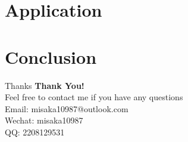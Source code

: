 \documentclass[aspectratio=169]{beamer}
\begin{document}
	\section{Application}
	
	\begin{frame}{}
		\begin{center}
		\end{center}
	\end{frame}

	\section{Conclusion}

	\begin{frame}{Thanks}
		\centering
		{\Huge \textbf{Thank You!}}\\[2em]
		{Feel free to contact me if you have any questions}\\[1em]
		{Email: misaka10987@outlook.com}\\
		{Wechat: misaka10987}\\
		{QQ: 2208129531}
	\end{frame}
	
\end{document}
